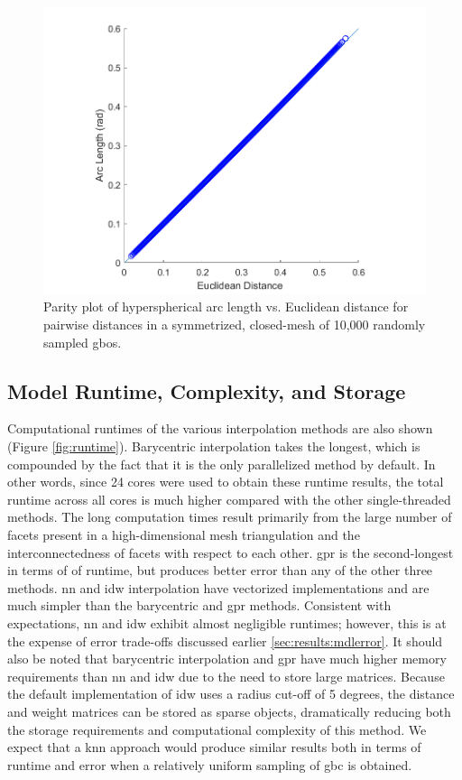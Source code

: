 \documentclass[preprint,12pt]{elsarticle}
\begin{document}
\begin{figure}
\centering
\includegraphics{dist-parity.png}
\caption{Parity plot of hyperspherical arc length vs. Euclidean distance for pairwise distances in a symmetrized, closed-mesh of 10,000 randomly sampled \glspl{gbo}.}
\label{fig:dist-parity}
\end{figure}

\subsection{Model Runtime, Complexity, and Storage}
Computational runtimes of the various interpolation methods are also shown (Figure \ref{fig:runtime}). Barycentric interpolation takes the longest, which is compounded by the fact that it is the only parallelized method by default. In other words, since 24 cores were used to obtain these runtime results, the total runtime across all cores is much higher compared with the other single-threaded methods. The long computation times result primarily from the large number of facets present in a high-dimensional mesh triangulation and the interconnectedness of facets with respect to each other. \Gls{gpr} is the second-longest in terms of of runtime, but produces better error than any of the other three methods. \Gls{nn} and \gls{idw} interpolation have vectorized implementations and are much simpler than the barycentric and \gls{gpr} methods. Consistent with expectations, \gls{nn} and \gls{idw} exhibit almost negligible runtimes; however, this is at the expense of error trade-offs discussed earlier \ref{sec:results:mdlerror}. It should also be noted that barycentric interpolation and \gls{gpr} have much higher memory requirements than \gls{nn} and \gls{idw} due to the need to store large matrices. Because the default implementation of \gls{idw} uses a radius cut-off of 5 degrees, the distance and weight matrices can be stored as sparse objects, dramatically reducing both the storage requirements and computational complexity of this method. We expect that a \gls{knn} approach would produce similar results both in terms of runtime and error when a relatively uniform sampling of \gls{gbc} is obtained.
\end{document}

